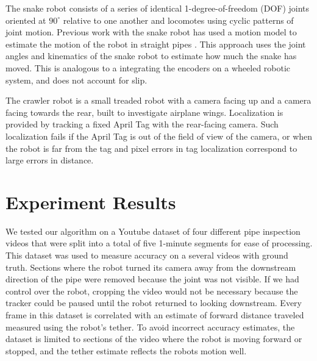 \documentclass[letterpaper, 10 pt, conference]{ieeeconf}
\begin{document}
The snake robot \cite{Wright2012} consists of a series of identical 1-degree-of-freedom (DOF) joints oriented at $90^{\circ}$ relative to one another and locomotes using cyclic patterns of joint motion. Previous work with the snake robot has used a motion model \cite{Enner2012} to estimate the motion of the robot in straight pipes \cite{Enner2013}. This approach uses the joint angles and kinematics of the snake robot to estimate how much the snake has moved. This is analogous to a integrating the encoders on a wheeled robotic system, and does not account for slip.

The crawler robot is a small treaded robot with a camera facing up and a camera facing towards the rear, built to investigate airplane wings. Localization is provided by tracking a fixed April Tag with the rear-facing camera. Such localization fails if the April Tag is out of the field of view of the camera, or when the robot is far from the tag and pixel errors in tag localization correspond to large errors in distance.

\section{Experiment Results}

We tested our algorithm on a Youtube dataset of four different pipe inspection videos that were split into a total of five 1-minute segments for ease of processing. This dataset was used to measure accuracy on a several videos with ground truth. Sections where the robot turned its camera away from the downstream direction of the pipe were removed because the joint was not visible. If we had control over the robot, cropping the video would not be necessary because the tracker could be paused until the robot returned to looking downstream. Every frame in this dataset is correlated with an estimate of forward distance traveled measured using the robot's tether. To avoid incorrect accuracy estimates, the dataset is limited to sections of the video where the robot is moving forward or stopped, and the tether estimate reflects the robots motion well.
\end{document}
